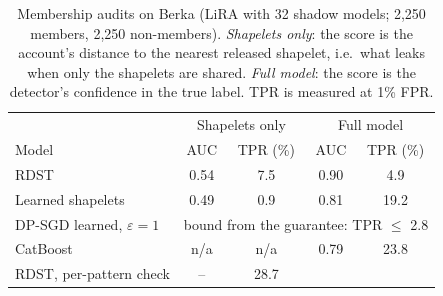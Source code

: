 \begin{table}[H]
\caption{Membership audits on Berka (LiRA with 32 shadow models; 2,250 members, 2,250 non-members). \emph{Shapelets only}: the score is the account's distance to the nearest released shapelet, i.e.\ what leaks when only the shapelets are shared. \emph{Full model}: the score is the detector's confidence in the true label. TPR is measured at 1\% FPR.}
\label{tab:lira}
\small\setlength{\tabcolsep}{3pt}
\centering
\begin{tabular}{lcccc}
\toprule
& \multicolumn{2}{c}{Shapelets only} & \multicolumn{2}{c}{Full model} \\
Model & AUC & TPR (\%) & AUC & TPR (\%) \\
\midrule
RDST & 0.54 & 7.5 & 0.90 & 4.9 \\
Learned shapelets & 0.49 & 0.9 & 0.81 & 19.2 \\
DP-SGD learned, $\varepsilon{=}1$ & \multicolumn{4}{c}{bound from the guarantee: TPR $\leq$ 2.8} \\
CatBoost & n/a & n/a & 0.79 & 23.8 \\
\midrule
RDST, per-pattern check & -- & 28.7 & & \\
\bottomrule\end{tabular}\end{table}
